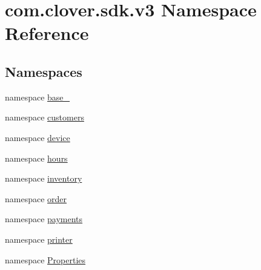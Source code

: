 \hypertarget{namespacecom_1_1clover_1_1sdk_1_1v3}{}\section{com.\+clover.\+sdk.\+v3 Namespace Reference}
\label{namespacecom_1_1clover_1_1sdk_1_1v3}
\subsection*{Namespaces}
\begin{DoxyCompactItemize}
\item 
namespace \hyperlink{namespacecom_1_1clover_1_1sdk_1_1v3_1_1base__}{base\+\_\+}
\item 
namespace \hyperlink{namespacecom_1_1clover_1_1sdk_1_1v3_1_1customers}{customers}
\item 
namespace \hyperlink{namespacecom_1_1clover_1_1sdk_1_1v3_1_1device}{device}
\item 
namespace \hyperlink{namespacecom_1_1clover_1_1sdk_1_1v3_1_1hours}{hours}
\item 
namespace \hyperlink{namespacecom_1_1clover_1_1sdk_1_1v3_1_1inventory}{inventory}
\item 
namespace \hyperlink{namespacecom_1_1clover_1_1sdk_1_1v3_1_1order}{order}
\item 
namespace \hyperlink{namespacecom_1_1clover_1_1sdk_1_1v3_1_1payments}{payments}
\item 
namespace \hyperlink{namespacecom_1_1clover_1_1sdk_1_1v3_1_1printer}{printer}
\item 
namespace \hyperlink{namespacecom_1_1clover_1_1sdk_1_1v3_1_1_properties}{Properties}
\end{DoxyCompactItemize}
